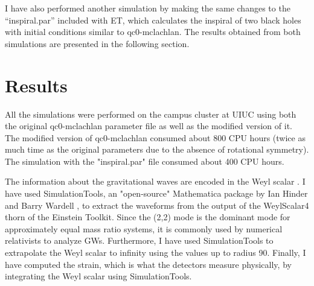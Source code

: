 \documentclass[aps,twocolumn,secnumarabic,nobalancelastpage,amsmath,amssymb,
nofootinbib]{revtex4}
\begin{document}
	I have also performed another simulation by making the same changes to the ``inspiral.par'' included with ET, which calculates the inspiral of two black holes with initial conditions similar to qc0-mclachlan. The results obtained from both simulations are presented in the following section. 
	
	
	
	\section{Results}
	All the simulations were performed on the campus cluster at UIUC using both the original qc0-mclachlan parameter file as well as the modified version of it. The modified version of qc0-mclachlan consumed about 800 CPU hours (twice as much time as the original parameters due to the absence of rotational symmetry). The simulation with the "inspiral.par" file consumed about 400 CPU hours.
	\newline
	
    The information about the gravitational waves are encoded in the Weyl scalar \cite{living}. I have used SimulationTools, an "open-source" Mathematica package by Ian Hinder and Barry Wardell \cite{simtools}, to extract the waveforms from the output of the WeylScalar4 thorn of the Einstein Toolkit. Since the (2,2) mode is the dominant mode for approximately equal mass ratio systems, it is commonly used by numerical relativists to analyze GWs. Furthermore, I have used SimulationTools to extrapolate the Weyl scalar to infinity using the values up to radius 90. Finally, I have computed the strain, which is what the detectors measure physically, by integrating the Weyl scalar using SimulationTools.
    \newline
    
\end{document}
